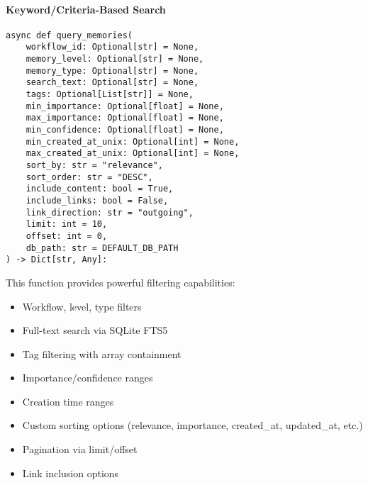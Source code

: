 \documentclass[12pt,a4paper]{article}
\begin{document}
\paragraph{Keyword/Criteria-Based Search}
\begin{pageablecode}
\begin{verbatim}
async def query_memories(
    workflow_id: Optional[str] = None,
    memory_level: Optional[str] = None,
    memory_type: Optional[str] = None,
    search_text: Optional[str] = None,
    tags: Optional[List[str]] = None,
    min_importance: Optional[float] = None,
    max_importance: Optional[float] = None,
    min_confidence: Optional[float] = None,
    min_created_at_unix: Optional[int] = None,
    max_created_at_unix: Optional[int] = None,
    sort_by: str = "relevance",
    sort_order: str = "DESC",
    include_content: bool = True,
    include_links: bool = False,
    link_direction: str = "outgoing",
    limit: int = 10,
    offset: int = 0,
    db_path: str = DEFAULT_DB_PATH
) -> Dict[str, Any]:
\end{verbatim}
\end{pageablecode}
This function provides powerful filtering capabilities:
\begin{itemize}
    \item Workflow, level, type filters
    \item Full-text search via SQLite FTS5
    \item Tag filtering with array containment
    \item Importance/confidence ranges
    \item Creation time ranges
    \item Custom sorting options (relevance, importance, created\_at, updated\_at, etc.)
    \item Pagination via limit/offset
    \item Link inclusion options
\end{itemize}
\end{document}
